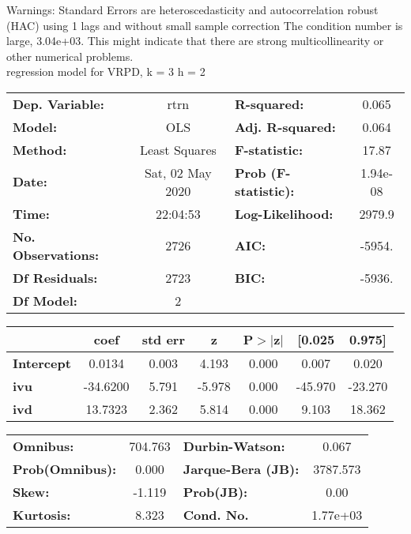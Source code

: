 Warnings: \newline
 [1] Standard Errors are heteroscedasticity and autocorrelation robust (HAC) using 1 lags and without small sample correction \newline
 [2] The condition number is large, 3.04e+03. This might indicate that there are \newline
 strong multicollinearity or other numerical problems.\\ 

regression model for VRPD, k = 3 h = 2\begin{center}
\begin{tabular}{lclc}
\toprule
\textbf{Dep. Variable:}    &       rtrn       & \textbf{  R-squared:         } &     0.065   \\
\textbf{Model:}            &       OLS        & \textbf{  Adj. R-squared:    } &     0.064   \\
\textbf{Method:}           &  Least Squares   & \textbf{  F-statistic:       } &     17.87   \\
\textbf{Date:}             & Sat, 02 May 2020 & \textbf{  Prob (F-statistic):} &  1.94e-08   \\
\textbf{Time:}             &     22:04:53     & \textbf{  Log-Likelihood:    } &    2979.9   \\
\textbf{No. Observations:} &        2726      & \textbf{  AIC:               } &    -5954.   \\
\textbf{Df Residuals:}     &        2723      & \textbf{  BIC:               } &    -5936.   \\
\textbf{Df Model:}         &           2      & \textbf{                     } &             \\
\bottomrule
\end{tabular}
\begin{tabular}{lcccccc}
                   & \textbf{coef} & \textbf{std err} & \textbf{z} & \textbf{P$> |$z$|$} & \textbf{[0.025} & \textbf{0.975]}  \\
\midrule
\textbf{Intercept} &       0.0134  &        0.003     &     4.193  &         0.000        &        0.007    &        0.020     \\
\textbf{ivu}       &     -34.6200  &        5.791     &    -5.978  &         0.000        &      -45.970    &      -23.270     \\
\textbf{ivd}       &      13.7323  &        2.362     &     5.814  &         0.000        &        9.103    &       18.362     \\
\bottomrule
\end{tabular}
\begin{tabular}{lclc}
\textbf{Omnibus:}       & 704.763 & \textbf{  Durbin-Watson:     } &    0.067  \\
\textbf{Prob(Omnibus):} &   0.000 & \textbf{  Jarque-Bera (JB):  } & 3787.573  \\
\textbf{Skew:}          &  -1.119 & \textbf{  Prob(JB):          } &     0.00  \\
\textbf{Kurtosis:}      &   8.323 & \textbf{  Cond. No.          } & 1.77e+03  \\
\bottomrule
\end{tabular}
\end{center}

